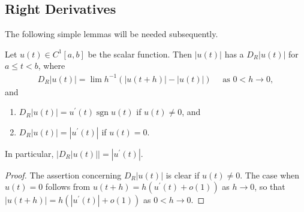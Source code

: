 \documentclass{article}
\begin{document}
\subsection{Right Derivatives}
The following simple lemmas will be needed subsequently. 
\begin{lema}
Let $u(t) \in C^{1}[a, b]$ be the scalar function. Then $|u(t)|$ has a  $D_{R}|u(t)|$ for $a \le t<b$, where
\begin{align}
    D_{R}|u(t)|=\lim h^{-1}(|u(t+h)|-|u(t)|) \quad\text{ as }0<h \rightarrow 0, \label{eq:cvadfadfad}
\end{align}
and 
\begin{enumerate}
    \item $D_{R}|u(t)|=u^{\prime}(t) \operatorname{sgn} u(t)$ if $u(t) \neq 0$, and 
    \item $D_{R}|u(t)|=\left|u^{\prime}(t)\right|$ if $u(t)=0$.  
\end{enumerate}
In particular, $\big|D_{R} |u(t)|\big|=\left|u^{\prime}(t)\right|$.
\end{lema} 
\begin{proof}
The assertion concerning $D_{R}|u(t)|$ is clear if $u(t) \neq 0$. The case when $u(t)=0$ follows from $u(t+h)=h\left(u^{\prime}(t)+o(1)\right)$ as $h \rightarrow 0$, so that $|u(t+h)|=h\left(\left|u^{\prime}(t)\right|+o(1)\right)$ as $0<h \rightarrow 0$.
\end{proof}
\end{document}
